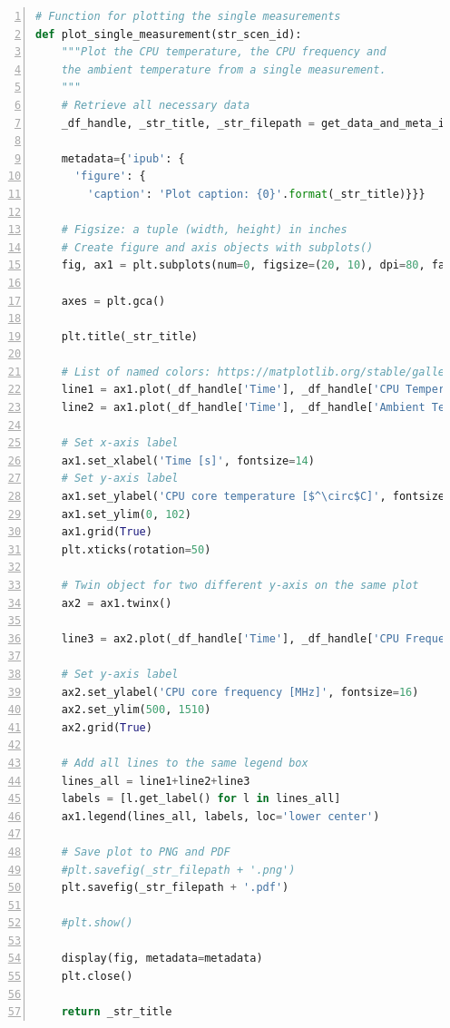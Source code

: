 \documentclass[10pt,parskip=half,
toc=sectionentrywithdots,
bibliography=totocnumbered,
captions=tableheading,numbers=noendperiod]{scrartcl}
\begin{document}
\begin{lstlisting}[language=Python,numbers=left,xleftmargin=20pt,xrightmargin=5pt,belowskip=5pt,aboveskip=5pt]
# Function for plotting the single measurements
def plot_single_measurement(str_scen_id):
    """Plot the CPU temperature, the CPU frequency and
    the ambient temperature from a single measurement.
    """
    # Retrieve all necessary data
    _df_handle, _str_title, _str_filepath = get_data_and_meta_infos_for_plotting(str_scen_id, df_measurement_configs, dict_of_df_records, dict_of_filenames)

    metadata={'ipub': {
      'figure': {
        'caption': 'Plot caption: {0}'.format(_str_title)}}}

    # Figsize: a tuple (width, height) in inches
    # Create figure and axis objects with subplots()
    fig, ax1 = plt.subplots(num=0, figsize=(20, 10), dpi=80, facecolor='w', edgecolor='k')

    axes = plt.gca()

    plt.title(_str_title)

    # List of named colors: https://matplotlib.org/stable/gallery/color/named_colors.html
    line1 = ax1.plot(_df_handle['Time'], _df_handle['CPU Temperature'], color='navy', label='CPU Temperature')
    line2 = ax1.plot(_df_handle['Time'], _df_handle['Ambient Temperature'], color='lightseagreen', label='Ambient Temperature')

    # Set x-axis label
    ax1.set_xlabel('Time [s]', fontsize=14)
    # Set y-axis label
    ax1.set_ylabel('CPU core temperature [$^\circ$C]', fontsize=16)
    ax1.set_ylim(0, 102)
    ax1.grid(True)
    plt.xticks(rotation=50)

    # Twin object for two different y-axis on the same plot
    ax2 = ax1.twinx()

    line3 = ax2.plot(_df_handle['Time'], _df_handle['CPU Frequency'], color='limegreen', label='CPU Frequency')

    # Set y-axis label
    ax2.set_ylabel('CPU core frequency [MHz]', fontsize=16)
    ax2.set_ylim(500, 1510)
    ax2.grid(True)

    # Add all lines to the same legend box
    lines_all = line1+line2+line3
    labels = [l.get_label() for l in lines_all]
    ax1.legend(lines_all, labels, loc='lower center')

    # Save plot to PNG and PDF
    #plt.savefig(_str_filepath + '.png')
    plt.savefig(_str_filepath + '.pdf')

    #plt.show()

    display(fig, metadata=metadata)
    plt.close()

    return _str_title
\end{lstlisting}
\end{document}
